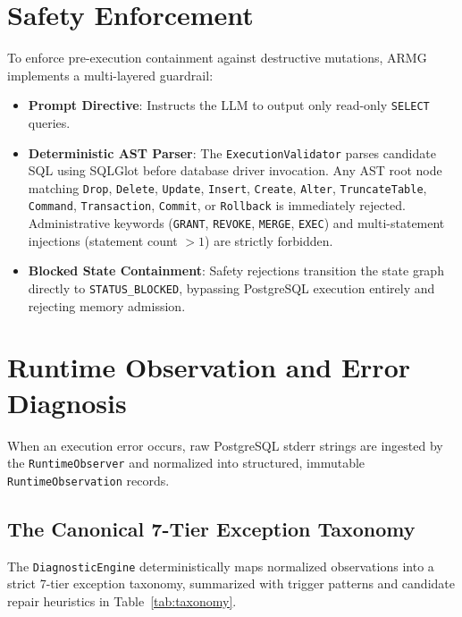 \section{Safety Enforcement}
To enforce pre-execution containment against destructive mutations, ARMG implements a multi-layered guardrail:
\begin{itemize}
    \item \textbf{Prompt Directive}: Instructs the LLM to output only read-only \texttt{SELECT} queries.
    \item \textbf{Deterministic AST Parser}: The \texttt{Execution\-Validator} parses candidate SQL using SQLGlot \cite{mao2023sqlglot} before database driver invocation. Any AST root node matching \texttt{Drop}, \allowbreak\texttt{Delete}, \allowbreak\texttt{Update}, \allowbreak\texttt{Insert}, \allowbreak\texttt{Create}, \allowbreak\texttt{Alter}, \allowbreak\texttt{Truncate\-Table}, \allowbreak\texttt{Command}, \allowbreak\texttt{Transaction}, \allowbreak\texttt{Commit}, or \allowbreak\texttt{Rollback} is immediately rejected. Administrative keywords (\texttt{GRANT}, \allowbreak\texttt{REVOKE}, \allowbreak\texttt{MERGE}, \allowbreak\texttt{EXEC}) and multi-statement injections (statement count $> 1$) are strictly forbidden.
    \item \textbf{Blocked State Containment}: Safety rejections transition the state graph directly to \texttt{STATUS\_\allowbreak BLOCKED}, bypassing PostgreSQL execution entirely and rejecting memory admission.
\end{itemize}

\section{Runtime Observation and Error Diagnosis}
When an execution error occurs, raw PostgreSQL stderr strings are ingested by the \texttt{RuntimeObserver} and normalized into structured, immutable \texttt{Runtime\-Observation} records.

\subsection{The Canonical 7-Tier Exception Taxonomy}
The \texttt{DiagnosticEngine} deterministically maps normalized observations into a strict 7-tier exception taxonomy, summarized with trigger patterns and candidate repair heuristics in Table~\ref{tab:taxonomy}.

